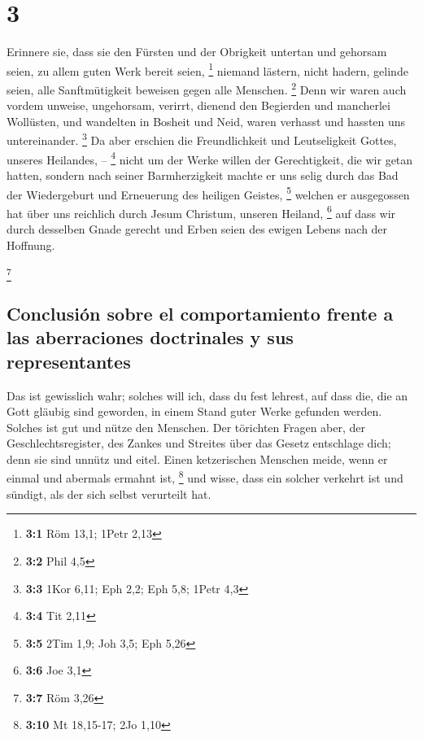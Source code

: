 \hypertarget{section-2}{%
\section{3}\label{section-2}}

 Erinnere sie, dass sie den Fürsten und der Obrigkeit
untertan und gehorsam seien, zu allem guten Werk bereit seien,
\footnote{\textbf{3:1} Röm 13,1; 1Petr 2,13}  niemand
lästern, nicht hadern, gelinde seien, alle Sanftmütigkeit beweisen gegen
alle Menschen. \footnote{\textbf{3:2} Phil 4,5}  Denn wir
waren auch vordem unweise, ungehorsam, verirrt, dienend den Begierden
und mancherlei Wollüsten, und wandelten in Bosheit und Neid, waren
verhasst und hassten uns untereinander. \footnote{\textbf{3:3} 1Kor
  6,11; Eph 2,2; Eph 5,8; 1Petr 4,3}  Da aber erschien die
Freundlichkeit und Leutseligkeit Gottes, unseres Heilandes, --
\footnote{\textbf{3:4} Tit 2,11}  nicht um der Werke
willen der Gerechtigkeit, die wir getan hatten, sondern nach seiner
Barmherzigkeit machte er uns selig durch das Bad der Wiedergeburt und
Erneuerung des heiligen Geistes, \footnote{\textbf{3:5} 2Tim 1,9; Joh
  3,5; Eph 5,26}  welchen er ausgegossen hat über uns
reichlich durch Jesum Christum, unseren Heiland, \footnote{\textbf{3:6}
  Joe 3,1}  auf dass wir durch desselben Gnade gerecht und
Erben seien des ewigen Lebens nach der Hoffnung.

\footnote{\textbf{3:7} Röm 3,26}

\hypertarget{conclusiuxf3n-sobre-el-comportamiento-frente-a-las-aberraciones-doctrinales-y-sus-representantes}{%
\subsection{Conclusión sobre el comportamiento frente a las aberraciones
doctrinales y sus
representantes}\label{conclusiuxf3n-sobre-el-comportamiento-frente-a-las-aberraciones-doctrinales-y-sus-representantes}}

 Das ist gewisslich wahr; solches will ich, dass du fest
lehrest, auf dass die, die an Gott gläubig sind geworden, in einem Stand
guter Werke gefunden werden. Solches ist gut und nütze den Menschen.
 Der törichten Fragen aber, der Geschlechtsregister, des
Zankes und Streites über das Gesetz entschlage dich; denn sie sind
unnütz und eitel.  Einen ketzerischen Menschen meide,
wenn er einmal und abermals ermahnt ist, \footnote{\textbf{3:10} Mt
  18,15-17; 2Jo 1,10}  und wisse, dass ein solcher
verkehrt ist und sündigt, als der sich selbst verurteilt hat.

